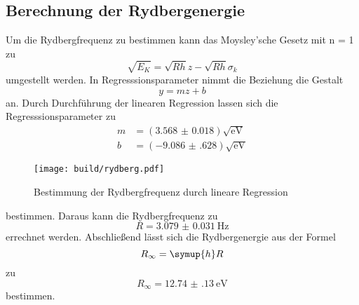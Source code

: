 \subsection{Berechnung der Rydbergenergie}
Um die Rydbergfrequenz zu bestimmen kann das Moysley'sche Gesetz mit n = 1 zu 
\begin{equation}
    \sqrt{E_K} = \sqrt{Rh}z - \sqrt{Rh}\sigma_k
\end{equation}
umgestellt werden.
In Regresssionsparameter nimmt die Beziehung die Gestalt
\begin{equation}
    y = mz+b
\end{equation}
an.
Durch Durchführung der linearen Regression lassen sich die Regresssionsparameter zu 
\begin{align*}
        m & = \left( \num{3.568(18)} \right)   \sqrt{\si{\electronvolt}} \\
        b & = \left( \num{-9.086(628)} \right) \sqrt{\si{\electronvolt}}
\end{align*}
\begin{figure}
    \centering
    \caption{Bestimmung der Rydbergfrequenz durch lineare Regression}
    \label{fig:rydberg}
    \texttt{[image: build/rydberg.pdf]}
\end{figure}
bestimmen.
Daraus kann die Rydbergfrequenz zu 
\begin{equation*}
    R = \SI{3.079(31)}{\hertz}
\end{equation*}
errechnet werden.
Abschließend lässt sich die Rydbergenergie aus der Formel
\begin{equation}
    R_\infty = \symup{h}R
\end{equation}
zu
\begin{equation*}
    R_\infty = \SI{12.74(13)}{\electronvolt}
\end{equation*}
bestimmen.